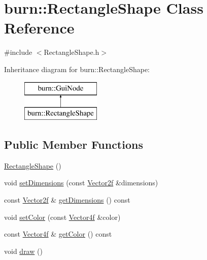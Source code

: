 \hypertarget{classburn_1_1_rectangle_shape}{\section{burn\-:\-:Rectangle\-Shape Class Reference}
\label{classburn_1_1_rectangle_shape}
}


{\ttfamily \#include $<$Rectangle\-Shape.\-h$>$}

Inheritance diagram for burn\-:\-:Rectangle\-Shape\-:\begin{figure}[H]
\begin{center}
\leavevmode
\includegraphics[height=2.000000cm]{classburn_1_1_rectangle_shape}
\end{center}
\end{figure}
\subsection*{Public Member Functions}
\begin{DoxyCompactItemize}
\item 
\hyperlink{classburn_1_1_rectangle_shape_ac029444077fab28ac8522df396dabc03}{Rectangle\-Shape} ()
\item 
void \hyperlink{classburn_1_1_rectangle_shape_a7edd436a3f94e40b781d9f29257f8341}{set\-Dimensions} (const \hyperlink{namespaceburn_af5ed9eb70cbf0fb572098ff43e146a0a}{Vector2f} \&dimensions)
\item 
const \hyperlink{namespaceburn_af5ed9eb70cbf0fb572098ff43e146a0a}{Vector2f} \& \hyperlink{classburn_1_1_rectangle_shape_a02cdb5e26dd7e6ae2d2ec7a06cc57e0b}{get\-Dimensions} () const 
\item 
void \hyperlink{classburn_1_1_rectangle_shape_a3dd38ddf8fb06205fd0f788ec68ba784}{set\-Color} (const \hyperlink{namespaceburn_a58a411b9d83c7970518a9250c1c78068}{Vector4f} \&color)
\item 
const \hyperlink{namespaceburn_a58a411b9d83c7970518a9250c1c78068}{Vector4f} \& \hyperlink{classburn_1_1_rectangle_shape_a0c942ba1465548b1ced36863678dba2b}{get\-Color} () const 
\item 
void \hyperlink{classburn_1_1_rectangle_shape_a39c5c1e57ada4a6beb32a84a501baabf}{draw} ()
\end{DoxyCompactItemize}
